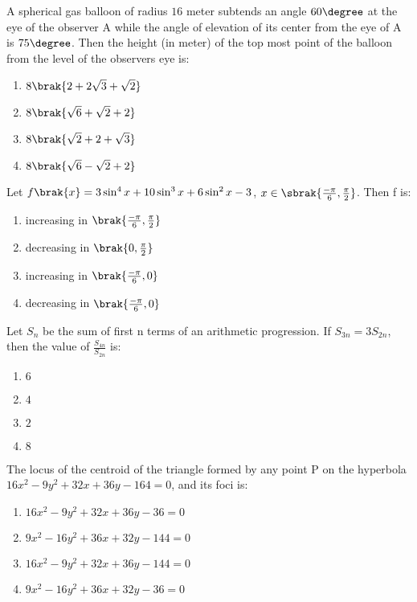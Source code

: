 
\iffalse
  \title{2021}
  \author{EE24BTECH11032}
  \section{mcq-single}
\fi
    \item A spherical gas balloon of radius $16$ meter subtends an angle $60\degree$ at the eye of the observer A while the angle of elevation of its center from the eye of A is $75\degree$. Then the height (in meter) of the top most point of the balloon from the level of the observers eye is: \hfill{}
		\begin{enumerate}
			\item $8\brak{2+2\sqrt{3}+\sqrt{2}}$
			\item $8\brak{\sqrt{6}+\sqrt{2}+2}$
			\item $8\brak{\sqrt{2}+2+\sqrt{3}}$
			\item $8\brak{\sqrt{6}-\sqrt{2}+2}$
		\end{enumerate}
	\item Let $f\brak{x}=3\sin^4{x}+10\sin^3{x}+6\sin^2{x}-3$, $x \in \sbrak{\frac{-\pi}{6}, \frac{\pi}{2}}$. Then f is: \hfill{}
		\begin{enumerate}
			\item increasing in $\brak{\frac{-\pi}{6},\frac{\pi}{2}}$
			\item decreasing in $\brak{0,\frac{\pi}{2}}$
			\item increasing in $\brak{\frac{-\pi}{6},0}$
			\item decreasing in $\brak{\frac{-\pi}{6},0}$
		\end{enumerate}
    \item Let $S_n$ be the sum of first n terms of an arithmetic progression. If $S_{3n}=3S_{2n}$, then the value of $\frac{S_{4n}}{S_{2n}}$ is: \hfill{}
    \begin{enumerate}
        \item $6$
        \item $4$
        \item $2$
        \item $8$
    \end{enumerate}
    \item The locus of the centroid of the triangle formed by any point P on the hyperbola $16x^2-9y^2+32x+36y-164=0$, and its foci is: \hfill{}
    \begin{enumerate}
        \item $16x^2-9y^2+32x+36y-36=0$
        \item $9x^2-16y^2+36x+32y-144=0$
        \item $16x^2-9y^2+32x+36y-144=0$
        \item $9x^2-16y^2+36x+32y-36=0$
    \end{enumerate}
